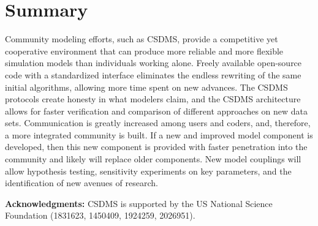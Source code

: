 \documentclass[10pt,twocolumn,preprint]{elsarticle}
\begin{document}
\section{Summary}

Community modeling efforts, such as CSDMS, provide a competitive yet cooperative environment that can produce more reliable and more flexible simulation models than individuals working alone. Freely available open-source code with a standardized interface eliminates the endless rewriting of the same initial algorithms, allowing more time spent on new advances. The CSDMS protocols create honesty in what modelers claim, and the CSDMS architecture allows for faster verification and comparison of different approaches on new data sets. Communication is greatly increased among users and coders, and, therefore, a more integrated community is built. If a new and improved model component is developed, then this new component is provided with faster penetration into the community and likely will replace older components. New model couplings will allow hypothesis testing, sensitivity experiments on key parameters, and the identification of new avenues of research.


\textbf{Acknowledgments:} CSDMS is supported by the US National Science Foundation (1831623, 1450409, 1924259, 2026951).



\end{document}
